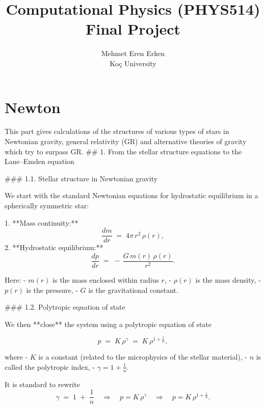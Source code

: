 \documentclass{article}
\title{Computational Physics (PHYS514) Final Project}
\author{Mehmet Eren Erken \\
Koç University}
\date{}
\begin{document}
\maketitle

\section*{Newton}

This part gives calculations of the structures of various types of stars in Newtonian gravity, general relativity (GR) and alternative theories of gravity which try to surpass GR.
## 1. From the stellar structure equations to the Lane–Emden equation

### 1.1. Stellar structure in Newtonian gravity

We start with the standard Newtonian equations for hydrostatic equilibrium in a spherically symmetric star:

1. **Mass continuity:**
   \[
   \frac{dm}{dr} \;=\; 4\pi\,r^{2}\,\rho(r),
   \]
2. **Hydrostatic equilibrium:**
   \[
   \frac{dp}{dr} \;=\; -\,\frac{G\,m(r)\,\rho(r)}{r^{2}}.
   \]

Here:
- \(m(r)\) is the mass enclosed within radius \(r\),
- \(\rho(r)\) is the mass density,
- \(p(r)\) is the pressure,
- \(G\) is the gravitational constant.


### 1.2. Polytropic equation of state

We then **close** the system using a polytropic equation of state

\[
p \;=\; K\,\rho^\gamma \;=\; K\,\rho^{1 + \tfrac{1}{n}},
\]

where
- \(K\) is a constant (related to the microphysics of the stellar material),
- \(n\) is called the polytropic index,
- \(\gamma = 1 + \frac{1}{n}\).

It is standard to rewrite
\[
\gamma \;=\; 1 \;+\;\frac{1}{n}
\quad\Longrightarrow\quad
p = K\,\rho^{\gamma}
\quad\Longrightarrow\quad
p = K\,\rho^{1 + \tfrac{1}{n}}.
\]
\end{document}

